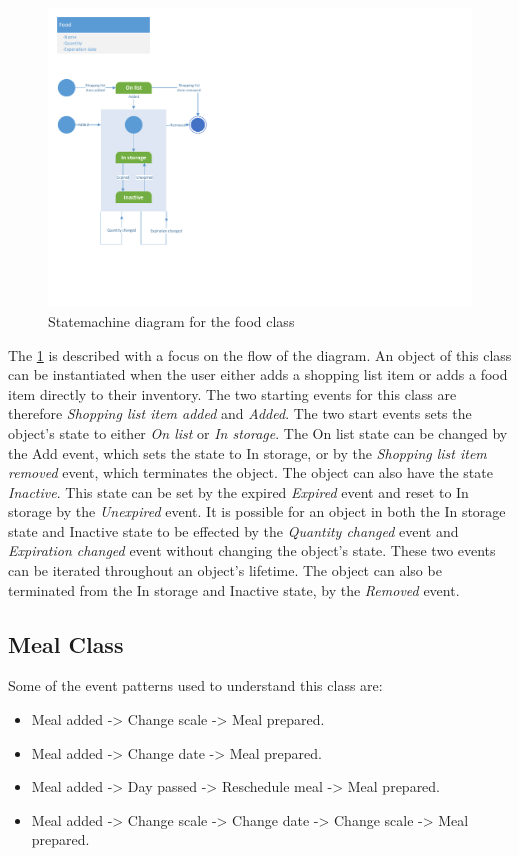 \begin{figure}[tbhp]
	\centering
	\includegraphics[clip=true, trim=0.5cm 4cm 18.5cm 0.5cm,  ]{Development/ProblemDomain/FoodClass.pdf}
	\caption{Statemachine diagram for the food class} \label{FoodClass} 
\end{figure}
The \cref{FoodClass} is described with a focus on the flow of the diagram.
An object of this class can be instantiated when the user either adds a shopping list item or adds a food item directly to their inventory. The two starting events for this class are therefore \textit{Shopping list item added} and \textit{Added}. The two start events sets the object's state to either \textit{On list} or \textit{In storage}. The On list state can be changed by the Add event, which sets the state to In storage, or by the \textit{Shopping list item removed} event, which terminates the object. The object can also have the state \textit{Inactive}. This state can be set by the expired \textit{Expired} event and reset to In storage by the \textit{Unexpired} event. It is possible for an object in both the In storage state and Inactive state to be effected by the \textit{Quantity changed} event and \textit{Expiration changed} event without changing the object's state. These two events can be iterated throughout an object's lifetime. The object can also be terminated from the In storage and Inactive state, by the \textit{Removed} event.   

\subsection{Meal Class}
Some of the event patterns used to understand this class are:
\begin{itemize}
	\item Meal added -> Change scale -> Meal prepared.
	\item Meal added -> Change date -> Meal prepared.
	\item Meal added -> Day passed -> Reschedule meal -> Meal prepared.
	\item Meal added -> Change scale -> Change date -> Change scale -> Meal prepared.
\end{itemize}


